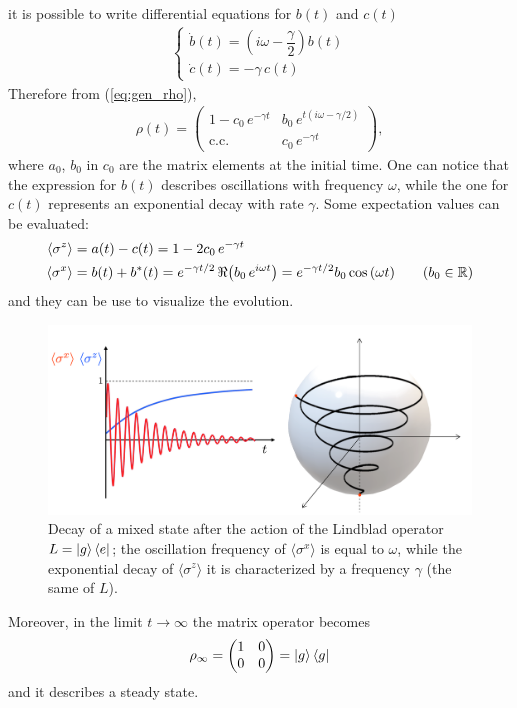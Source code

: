 \begin{tcolorbox} 
\begin{align*}
\end{align*}
it is possible to write differential equations for $b(t)$ and $c(t)$
\begin{align*}
    \begin{cases}
    \dot{b}(t) = \displaystyle \left( i \omega - \dfrac{\gamma}{2}\right) b(t) \\
    \dot{c}(t) = -\gamma \, c(t) 
    \end{cases}
\end{align*}
Therefore from (\ref{eq:gen_rho}), 
\begin{align*}
    \rho(t) = \begin{pmatrix} 1-c_0 \, e^{-\gamma t} & b_0 \, e^{t(i\omega - \gamma/2)} \\ \text{c.c.} & c_0 \, e^{-\gamma t} \end{pmatrix},
\end{align*}
where $a_0$, $b_0$ in $c_0$ are the matrix elements at the initial time. One can notice that the expression for $b(t)$ describes oscillations with frequency $\omega$, while the one for $c(t)$ represents an exponential decay with rate $\gamma$. Some expectation values can be evaluated:
\begin{align*}
    \langle \sigma^z \rangle &= a(t) - c(t) = 1 - 2 c_0 \, e^{- \gamma t} \\
    \langle \sigma^x \rangle &= b(t) + b^*(t) = e^{-\gamma t /2} \, \real{\left(b_0 \, e^{i \omega t }\right)} = e^{-\gamma t /2} b_0 \cos{(\omega t)}  \qquad (b_0 \in \mathbb{R})
\end{align*}
and they can be use to visualize the evolution. 
\begin{figure}[H]
\centering
\includegraphics[width=0.87\linewidth]{images/Decay.png}
    \caption{Decay of a mixed state after the action of the Lindblad operator $L = \ket{g}\bra{e}$; the oscillation frequency of $\langle \sigma^x \rangle$ is equal to $\omega$, while the exponential decay of $\langle \sigma^z \rangle$ it is characterized by a frequency $\gamma$ (the same of $L$).}
    \label{fig:decay}
\end{figure}

Moreover, in the limit $t \to \infty$ the matrix operator becomes 
\begin{align*}
    \rho_\infty = \begin{pmatrix} 1 & 0 \\ 0 & 0 \end{pmatrix} = \ket{g}\bra{g}
\end{align*}
and it describes a steady state.
\end{tcolorbox}



